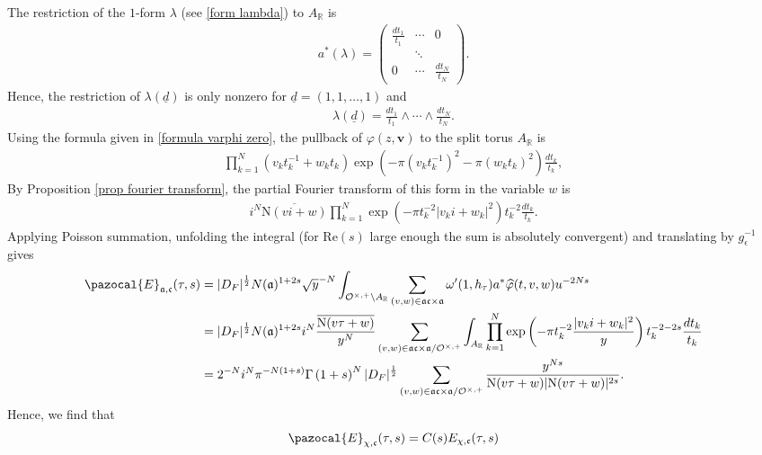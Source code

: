 \documentclass[twoside,a4paper,10pt]{article} %
\newcommand{\uud}{\underline{d}}
\newcommand{\8}{\infty}
\newcommand{\vbf}{\mathbf{v}}
\newcommand{\R}{\mathbb{R}}
\newcommand{\afrak}{\mathfrak{a}}
\newcommand{\cfrak}{\mathfrak{c}}
\newcommand{\N}{\mathrm{N}}
\newcommand{\Ocal}{\mathcal{O}}
\newcommand{\Ecal}{\pazocal{E}}
\newcommand{\re}{\mathrm{Re}}
\theoremstyle{mytheoremstyle}
\theoremstyle{remark}
\numberwithin{equation}{section}
\begin{document}
The restriction of the $1$-form $\lambda$ (see \eqref{form lambda}) to $A_\R$ is
\begin{align}
a^\ast (\lambda) =\begin{pmatrix} \frac{dt_1}{t_1} & \cdots & 0 \\  & \ddots &  \\ 0 & \cdots & \frac{dt_N}{t_N}
\end{pmatrix}.
\end{align}
Hence, the restriction of $\lambda(\uud)$ is only nonzero for $\uud=(1,1,\dots,1)$ and
\begin{align}
\lambda(\uud)=\frac{dt_1}{t_1} \wedge \cdots \wedge \frac{dt_N}{t_N}.
\end{align}
Using the formula given in \eqref{formula varphi zero}, the pullback of $\varphi(z,\vbf)$ to the split torus $A_\R$ is
\begin{align}
\prod_{k=1}^N (v_kt^{-1}_k+w_kt_k)\exp \left (-\pi \left ( v_kt^{-1}_k\right )^2 -\pi \left (w_kt_k \right )^2 \right ) \frac{dt_k}{t_k},
\end{align}
By Proposition \ref{prop fourier transform}, the partial Fourier transform of this form in the variable $w$ is
\begin{align} \label{partial fourier phi}
 i^N \overline{\N(vi+w)}\prod_{k=1}^N \exp \left (-\pi t_k^{-2}\vert v_ki+w_k \vert^2 \right )t_k^{-2} \frac{dt_k}{t_k}.
\end{align}
Applying Poisson summation, unfolding the integral (for $\re(s)$ large enough the sum is absolutely convergent) and translating by $g_{\epsilon}^{-1}$ gives
\begin{align}
\Ecal_{\afrak,\cfrak}(\tau,s) & =\vert D_F \vert^\frac{1}{2}N(\afrak)^{1+2s} \sqrt{y}^{-N} \int_{\Ocal^{\times,+} \backslash A_\R} \sum_{(v,w) \in \afrak\cfrak \times \afrak } \omega'(1,h_\tau)a^\ast \widehat{\varphi}(t,v,w)u^{-2Ns} \\
& = \vert D_F \vert^\frac{1}{2}N(\afrak)^{1+2s} i^N \frac{\overline{\N(v\tau+w)}}{y^N} \sum_{(v,w) \in \afrak\cfrak \times \afrak/\Ocal^{\times,+}} \int_{A_\R} \prod_{k=1}^N  \exp \left (-\pi t_k^{-2}\frac{ \vert v_ki+w_k \vert^2}{y} \right )t_k^{-2-2s} \frac{dt_k}{t_k} \\
& = 2^{-N}i^N \pi^{-N(1+s)}\Gamma \left ( 1+s \right )^N \vert D_F \vert^\frac{1}{2}  \sum_{(v,w) \in \afrak\cfrak \times \afrak/\Ocal^{\times,+}} \frac{y^{Ns}}{\N(v\tau+w) \vert \N(v\tau+w) \vert^{2s}}.
\end{align}
Hence, we find that
\begin{align}
\Ecal_{\chi,\cfrak}(\tau,s)= C(s) E_{\chi,\cfrak}(\tau,s)
\end{align}
\end{document}
